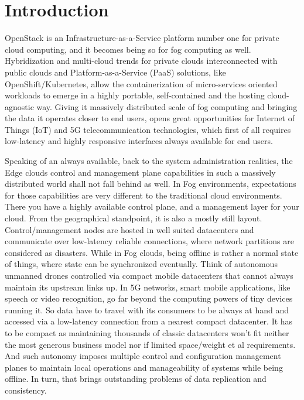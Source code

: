\documentclass[conference]{IEEEtran}
\begin{document}
\section{Introduction}
OpenStack is an Infrastructure-as-a-Service platform number one for private
cloud computing, and it becomes being so for fog computing as well.
Hybridization and multi-cloud trends for private clouds interconnected with
public clouds and Platform-as-a-Service (PaaS) solutions, like
OpenShift/Kubernetes, allow the containerization of micro-services oriented
workloads to emerge in a highly portable, self-contained and the hosting
cloud-agnostic way. Giving it massively distributed scale of fog computing and
bringing the data it operates closer to end users, opens great opportunities
for Internet of Things (IoT) and 5G telecommunication technologies,
which first of all requires low-latency and highly responsive interfaces always
available for end users.

Speaking of an always available, back to the system administration realities,
the Edge clouds control and management plane capabilities in such a massively
distributed world shall not fall behind as well. In Fog environments,
expectations for those capabilities are very different to the traditional cloud
environments. There you have a highly available control plane, and a management
layer for your cloud. From the geographical standpoint, it is also a mostly
still layout. Control/management nodes are hosted in well suited datacenters
and communicate over low-latency reliable connections, where network partitions
are considered as disasters. While in Fog clouds, being offline is rather a
normal state of things, where state can be synchronized eventually. Think of
autonomous unmanned drones controlled via compact mobile datacenters that
cannot always maintain its upstream links up. In 5G networks, smart mobile
applications, like speech or video recognition, go far beyond the computing
powers of tiny devices running it. So data have to travel with its consumers to
be always at hand and accessed via a low-latency connection from a nearest
compact datacenter. It has to be compact as maintaining thousands of classic
datacenters won't fit neither the most generous business model nor if limited
space/weight et al requirements. And such autonomy imposes multiple control and
configuration management planes to maintain local operations and manageability
of systems while being offline. In turn, that brings outstanding problems of
data replication and consistency.
\end{document}
